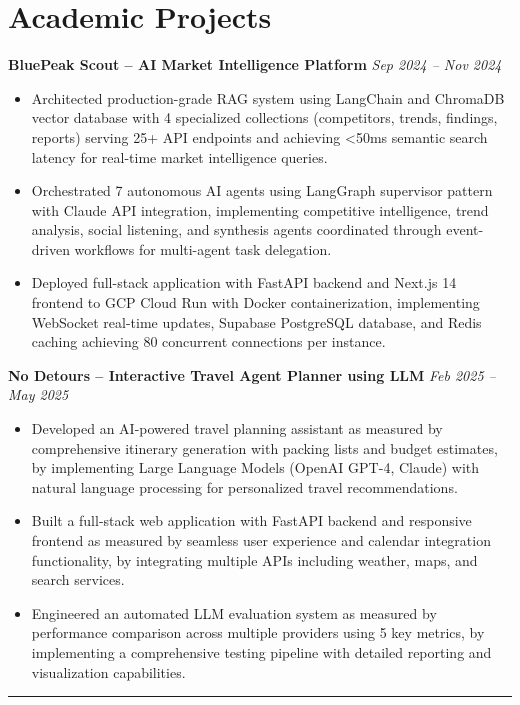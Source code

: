 \documentclass[a4paper,10pt]{article}
\newcommand{\sectionline}{\vspace{-0.2em}\noindent\rule{\linewidth}{0.6pt}\vspace{-0.5em}}
\begin{document}
\section*{Academic Projects}
\textbf{BluePeak Scout -- AI Market Intelligence Platform} \hfill \textit{Sep 2024 -- Nov 2024}
\begin{itemize}[leftmargin=1.5em, itemsep=0em, parsep=0pt]
  \item Architected production-grade RAG system using LangChain and ChromaDB vector database with 4 specialized collections (competitors, trends, findings, reports) serving 25+ API endpoints and achieving <50ms semantic search latency for real-time market intelligence queries.
  \item Orchestrated 7 autonomous AI agents using LangGraph supervisor pattern with Claude API integration, implementing competitive intelligence, trend analysis, social listening, and synthesis agents coordinated through event-driven workflows for multi-agent task delegation.
  \item Deployed full-stack application with FastAPI backend and Next.js 14 frontend to GCP Cloud Run with Docker containerization, implementing WebSocket real-time updates, Supabase PostgreSQL database, and Redis caching achieving 80 concurrent connections per instance.
\end{itemize}
\textbf{No Detours -- Interactive Travel Agent Planner using LLM} \hfill \textit{Feb 2025 -- May 2025}
\begin{itemize}[leftmargin=1.5em, itemsep=0em, parsep=0pt]
  \item Developed an AI-powered travel planning assistant as measured by comprehensive itinerary generation with packing lists and budget estimates, by implementing Large Language Models (OpenAI GPT-4, Claude) with natural language processing for personalized travel recommendations.
  \item Built a full-stack web application with FastAPI backend and responsive frontend as measured by seamless user experience and calendar integration functionality, by integrating multiple APIs including weather, maps, and search services.
  \item Engineered an automated LLM evaluation system as measured by performance comparison across multiple providers using 5 key metrics, by implementing a comprehensive testing pipeline with detailed reporting and visualization capabilities.
\end{itemize}
\sectionline
\end{document}
